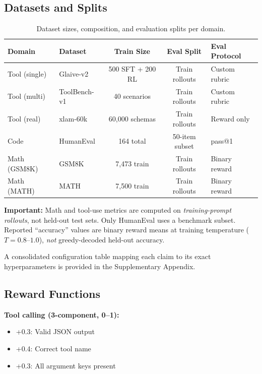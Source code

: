 \documentclass{article}
\begin{document}
\subsection{Datasets and Splits}

\begin{table}[htbp]
    \centering
    \caption{Dataset sizes, composition, and evaluation splits per domain.}
    \begin{tabular}{llccl}
        \toprule
        Domain & Dataset & Train Size & Eval Split & Eval Protocol \\
        \midrule
        Tool (single) & Glaive-v2 & 500 SFT + 200 RL & Train rollouts & Custom rubric \\
        Tool (multi) & ToolBench-v1 & 40 scenarios & Train rollouts & Custom rubric \\
        Tool (real) & xlam-60k & 60,000 schemas & Train rollouts & Reward only \\
        Code & HumanEval & 164 total & 50-item subset & pass@1 \\
        Math (GSM8K) & GSM8K & 7,473 train & Train rollouts & Binary reward \\
        Math (MATH) & MATH & 7,500 train & Train rollouts & Binary reward \\
        \bottomrule
    \end{tabular}
    \label{tab:datasets}
\end{table}

\textbf{Important:} Math and tool-use metrics are computed on \emph{training-prompt rollouts}, not held-out test sets. Only HumanEval uses a benchmark subset. Reported ``accuracy'' values are binary reward means at training temperature ($T{=}0.8$--$1.0$), \emph{not} greedy-decoded held-out accuracy.

A consolidated configuration table mapping each claim to its exact hyperparameters is provided in the Supplementary Appendix.

\subsection{Reward Functions}

\textbf{Tool calling (3-component, 0--1):}
\begin{itemize}
    \item +0.3: Valid JSON output
    \item +0.4: Correct tool name
    \item +0.3: All argument keys present
\end{itemize}
\end{document}
